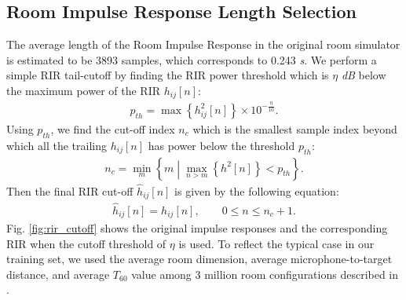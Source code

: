 \documentclass[a4paper]{article}
\begin{document}
\subsection{Room Impulse Response Length Selection}
%
%
The average length of the Room Impulse Response in the original room
simulator is estimated to be 3893 samples, which corresponds to 0.243
\textit{s}.
%
We perform a simple RIR tail-cutoff by finding the RIR power threshold
which is $\eta$ \textit{dB} below the maximum power of the RIR
$h_{ij}[n]$:
\begin{align}
  p_{th} = \max \left \{h_{ij}^2[n] \right \} \times 10^{-\frac{\eta}{10}}.
  \label{eq:p_th_def}
\end{align}
Using $p_{th}$, we find the cut-off index $n_c$ which is the smallest
sample index beyond which all the trailing $h_{ij}[n]$ has power
below the threshold $p_{th}$:
\begin{align}
  n_c = \min_{m} \left\{
  m \middle| \max_{n > m} \left\{  h^2[n] \right \} <  p_{th}  \right \}.
\end{align}
Then the final RIR cut-off $\widehat{h}_{ij}[n]$ is given
by the following equation:
\begin{align}
  \widehat{h}_{ij}[n] = h_{ij}[n], \qquad 0 \le n \le n_c + 1.
\end{align}
Fig. \ref{fig:rir_cutoff} shows the original impulse responses and
the corresponding RIR when the cutoff threshold of $\eta$ is used.
To reflect the typical case in
our training set, we used the average room dimension, average
microphone-to-target distance, and average $T_{60}$ value among
3 million room configurations described in \cite{C_Kim_INTERSPEECH_2017_1}.
\end{document}
